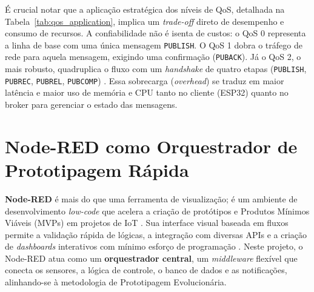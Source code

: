 É crucial notar que a aplicação estratégica dos níveis de QoS, detalhada na Tabela~\ref{tab:qos_application}, implica um \textit{trade-off} direto de desempenho e consumo de recursos.
A confiabilidade não é isenta de custos: o QoS 0 representa a linha de base com uma única mensagem \texttt{PUBLISH}.
O QoS 1 dobra o tráfego de rede para aquela mensagem, exigindo uma confirmação (\texttt{PUBACK}).
Já o QoS 2, o mais robusto, quadruplica o fluxo com um \textit{handshake} de quatro etapas (\texttt{PUBLISH}, \texttt{PUBREC}, \texttt{PUBREL}, \texttt{PUBCOMP}) \cite{mqtt_qos_thingsboard}.
Essa sobrecarga (\textit{overhead}) se traduz em maior latência e maior uso de memória e CPU tanto no cliente (ESP32) quanto no broker para gerenciar o estado das mensagens.
\section{Node-RED como Orquestrador de Prototipagem Rápida}
\textbf{Node-RED} é mais do que uma ferramenta de visualização;
é um ambiente de desenvolvimento \textit{low-code} que acelera a criação de protótipos e Produtos Mínimos Viáveis (MVPs) em projetos de IoT \cite{nodered_lowcode_qbee, nodered_rapid_prototyping}.
Sua interface visual baseada em fluxos permite a validação rápida de lógicas, a integração com diversas APIs e a criação de \textit{dashboards} interativos com mínimo esforço de programação \cite{nodered_advantages_apifornia, nodered_advantages_iot-solution}.
Neste projeto, o Node-RED atua como um \textbf{orquestrador central}, um \textit{middleware} flexível que conecta os sensores, a lógica de controle, o banco de dados e as notificações, alinhando-se à metodologia de Prototipagem Evolucionária.
